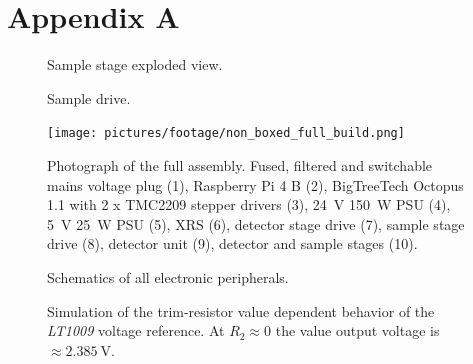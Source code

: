 \chapter{Appendix A}\label{sec:appendix a}
    \begin{figure}[h]
        \centering
        \caption[Sample stage exploded view.]{Sample stage exploded view.}%
        \label{fig:sample stage exploded}%
    \end{figure}
    \newpage
    \begin{figure}[h]
        \centering
        \caption[Sample drive.]{Sample drive.}%
        \label{fig:sample drive}%
    \end{figure}
    \newpage
    \begin{figure}[h]
        \centering
        \texttt{[image: pictures/footage/non\_boxed\_full\_build.png]}
        \caption[Photograph of the full assembly]{Photograph of the full assembly. Fused, filtered and switchable mains voltage plug (1), Raspberry Pi 4 B (2), BigTreeTech Octopus 1.1 with 2 x TMC2209 stepper drivers (3), \qty{24}{\volt} \qty{150}{\watt} PSU (4), \qty{5}{\volt} \qty{25}{\watt} PSU (5), XRS (6), detector stage drive (7), sample stage drive (8), detector unit (9), detector and sample stages (10).}%
        \label{fig:non boxed full assembly}
    \end{figure}
    \newpage
    \begin{figure}[h]
        \centering
        
        \caption[Schematics of all electronic peripherals]{Schematics of all electronic peripherals.}%
        \label{fig:schematics of peripherals}
    \end{figure}
    \newpage
    \begin{figure}[h]
        \centering
        
        \caption[Simulation of the trim-resistor value dependent behavior of the \textit{LT1009} voltage reference]{Simulation of the trim-resistor value dependent behavior of the \textit{LT1009} voltage reference. At \(R_2 \approx 0\) the value output voltage is \(\approx \qty{2.385}{\volt}\).}%
        \label{fig:LT1009 sim}
    \end{figure}
